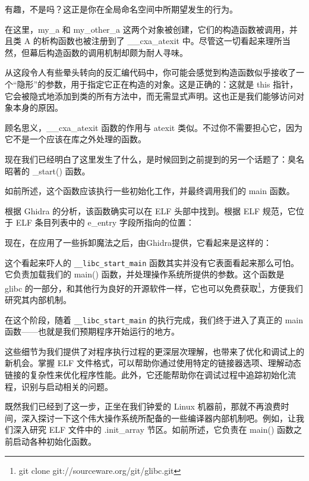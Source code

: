 
有趣，不是吗？这正是你在全局命名空间中所期望发生的行为。

在这里，my\_a 和 my\_other\_a 这两个对象被创建，它们的构造函数被调用，并且类 A 的析构函数也被注册到了 \_\_cxa\_atexit 中。尽管这一切看起来理所当然，但幕后构造函数的调用机制却颇为耐人寻味。

从这段令人有些晕头转向的反汇编代码中，你可能会感觉到构造函数似乎接收了一个“隐形”的参数，用于指定它正在构造的对象。这是正确的：这就是 this 指针，它会被隐式地添加到类的所有方法中，而无需显式声明。这也正是我们能够访问对象本身的原因。

顾名思义，\_\_cxa\_atexit 函数的作用与 atexit 类似。不过你不需要担心它，因为它不是一个应该在库之外处理的函数。

现在我们已经明白了这里发生了什么，是时候回到之前提到的另一个话题了：臭名昭著的 \_start() 函数。

如前所述，这个函数应该执行一些初始化工作，并最终调用我们的 main 函数。

根据 Ghidra 的分析，该函数确实可以在 ELF 头部中找到。根据 ELF 规范，它位于 ELF 条目列表中的 e\_entry 字段所指向的位置：


现在，在应用了一些拆卸魔法之后，由Ghidra提供，它看起来是这样的：


这个看起来吓人的 \verb|__libc_start_main| 函数其实并没有它表面看起来那么可怕。它负责加载我们的 main() 函数，并处理操作系统所提供的参数。这个函数是 glibc 的一部分，和其他行为良好的开源软件一样，它也可以免费获取\footnote{git clone git://sourceware.org/git/glibc.git}，方便我们研究其内部机制。

在这个阶段，随着 \verb|__libc_start_main| 的执行完成，我们终于进入了真正的 main 函数——也就是我们预期程序开始运行的地方。

这些细节为我们提供了对程序执行过程的更深层次理解，也带来了优化和调试上的新机会。掌握 ELF 文件格式，可以帮助你通过使用特定的链接器选项、理解动态链接的复杂性来优化程序性能。此外，它还能帮助你在调试过程中追踪初始化流程，识别与启动相关的问题。


既然我们已经到了这一步，正坐在我们钟爱的 Linux 机器前，那就不再浪费时间，深入探讨一下这个伟大操作系统所配备的一些编译器内部机制吧。例如，让我们深入研究 ELF 文件中的 .init\_array 节区。如前所述，它负责在 main() 函数之前启动各种初始化函数。


